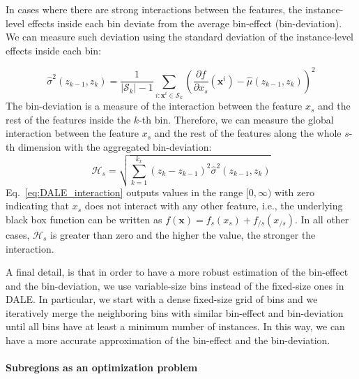 \documentclass[runningheads]{llncs}
\newcommand{\dfdx}{\frac{\partial f}{\partial x_s}}
\newcommand{\xb}{\mathbf{x}}
\begin{document}
In cases where there are strong interactions between the features,
the instance-level effects inside each bin deviate from the average bin-effect (bin-deviation).
We can measure such deviation using the standard deviation of the instance-level effects inside each bin:

\begin{equation}
  \label{eq:var_bin_approx}
  \hat{\sigma}^2(z_{k-1}, z_k) = \frac{1}{|\mathcal{S}_k| - 1}
\sum_{i:\mathbf{x}^i \in \mathcal{S}_k} \left ( \dfdx(\mathbf{x}^i) -
  \hat{\mu}(z_{k-1}, z_k) \right )^2
\end{equation}
%
The bin-deviation is a measure of the interaction between the feature \(x_s\) and the rest of the features inside the \(k\)-th bin.
Therefore, we can measure the global interaction between the feature \(x_s\) and the rest of the features along the whole \(s\)-th dimension
with the aggregated bin-deviation:
\begin{equation}
  \label{eq:DALE_interaction}
  \mathcal{H}_s = \sqrt{ \sum_{k=1}^{k_x} (z_k - z_{k-1})^2 \hat{\sigma}^2(z_{k-1}, z_k) }
\end{equation}
%
Eq.~\eqref{eq:DALE_interaction} outputs values in the range \([0, \infty)\) with zero indicating that \(x_s\) does not interact with any other feature,
i.e., the underlying black box function can be written as $f(\xb) = f_s(x_s) + f_{/s}(x_{/s})$.
In all other cases, $\mathcal{H}_s$ is greater than zero and the higher the value, the stronger the interaction.

A final detail, is that in order to have a more robust estimation of the bin-effect and the bin-deviation,
we use variable-size bins instead of the fixed-size ones in DALE.
In particular, we start with a dense fixed-size grid of bins and we iteratively merge the neighboring bins with similar
bin-effect and bin-deviation until all bins have at least a minimum number of instances.
In this way, we can have a more accurate approximation of the bin-effect and the bin-deviation.

\paragraph{Subregions as an optimization problem}
\end{document}
